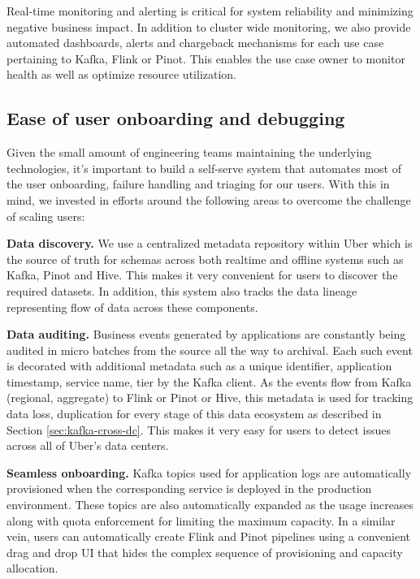 \documentclass[sigconf]{acmart}
\begin{document}
Real-time monitoring and alerting is critical for system reliability and minimizing negative business impact. In addition to cluster wide monitoring, we also provide automated dashboards, alerts and chargeback mechanisms for each use case pertaining to Kafka, Flink or Pinot. This enables the use case owner to monitor health as well as optimize resource utilization.

\subsection{Ease of user onboarding and debugging}

Given the small amount of engineering teams maintaining the underlying technologies, it’s important to build a self-serve system that automates most of the user onboarding, failure handling and triaging for our users. With this in mind, we invested in efforts around the following areas to overcome the challenge of scaling users:

{\bfseries Data discovery.} We use a centralized metadata repository within Uber which is the source of truth for schemas across both realtime and offline systems such as Kafka, Pinot and Hive. This makes it very convenient for users to discover the required datasets. In addition, this system also tracks the data lineage representing flow of data across these components.

{\bfseries Data auditing.} Business events generated by applications are constantly being audited in micro batches from the source all the way to archival. Each such event is decorated with additional metadata such as a unique identifier, application timestamp, service name, tier by the Kafka client. As the events flow from Kafka (regional, aggregate) to Flink or Pinot or Hive, this metadata is used for tracking data loss, duplication for every stage of this data ecosystem as described in Section \ref{sec:kafka-cross-dc}. This makes it very easy for users to detect issues across all of Uber’s data centers. 

{\bfseries Seamless onboarding.} Kafka topics used for application logs are automatically provisioned when the corresponding service is deployed in the production environment. These topics are also automatically expanded as the usage increases along with quota enforcement for limiting the maximum capacity. In a similar vein, users can automatically create Flink and Pinot pipelines using a convenient drag and drop UI that hides the complex sequence of provisioning and capacity allocation\cite{uworc}.
\end{document}
